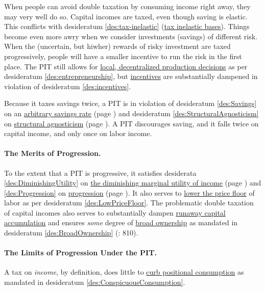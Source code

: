 When people can avoid double taxation by consuming income right away, they may very well do so. Capital incomes are taxed, even though saving is elastic. This conflicts with desideratum \ref{des:tax-inelastic} (\hyperref[des:tax-inelastic]{tax inelastic bases}). Things become even more awry when we consider investments (savings) of different risk. When the (uncertain, but hiwher) rewards of risky investment are taxed progressively, people will have a smaller incentive to run the risk in the first place. The PIT still allows for \hyperref[des:entrepreneurship]{local, decentralized production decisions} as per desideratum \ref{des:entrepreneurship}, but \hyperref[des:incentives]{incentives} are substantially dampened in violation of desideratum \ref{des:incentives}.

Because it taxes savings twice, a PIT is in violation of desideratum \ref{des:Savings} on an \hyperref[des:Savings]{arbitrary savings rate} (page \pageref{des:Savings}) and desideratum \ref{des:StructuralAgnosticism} on \hyperref[des:StructuralAgnosticism]{structural agnosticism} (page \pageref{des:StructuralAgnosticism}). A PIT discourages saving, and it falls twice on capital income, and only once on labor income.

\paragraph{The Merits of Progression.} To the extent that a PIT is progressive, it satisfies desiderata \ref{des:DiminishingUtility} on \hyperref[des:DiminishingUtility]{the diminishing marginal utility of income} (page \pageref{des:DiminishingUtility}) and \ref{des:Progression} on \hyperref[des:Progression]{progression} (page \pageref{des:Progression}). It also serves to \hyperref[des:LowPriceFloor]{lower the price floor} of labor as per desideratum \ref{des:LowPriceFloor}. The problematic double taxation of capital incomes also serves to substantially dampen \hyperref[sec:GovDynofIneq]{runaway capital accumulation} and ensures \emph{some} degree of \hyperref[des:BroadOwnership]{broad ownership} as mandated in desideratum \ref{des:BroadOwnership} (\citealt{McCaffery2005}: 810).

\paragraph{The Limits of Progression Under the PIT.} A tax on \emph{income}, by definition, does little to \hyperref[des:ConspicuousConsumption]{curb positional consumption} as mandated in desideratum \ref{des:ConspicuousConsumption}.

